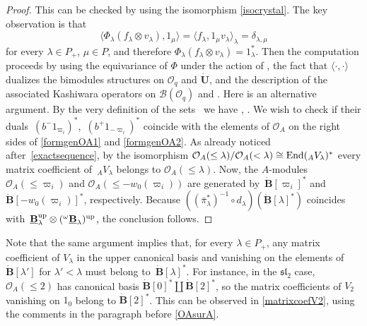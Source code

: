 \documentclass[10pt,a4paper]{amsart}
\numberwithin{equation}{section}
\theoremstyle{definition}
\newcommand{\Oq}{\Oo_{q}}
\newcommand{\Oo}{{\mathcal O}}
\begin{document}
\begin{proof} This can be checked by using the isomorphism \eqref{isocrystal}. The key observation is that
 \[\langle \Phi_\lambda(f_\lambda \otimes v_\lambda), 1_\mu\rangle = \langle f_\lambda , 1_\mu v_\lambda \rangle_\lambda = \delta_{\lambda,\mu}\]
 for every $\lambda\in P_+$, $\mu\in P$, and therefore $\Phi_\lambda(f_\lambda \otimes v_\lambda) = 1_\lambda^*$. Then the computation proceeds by using the equivariance of $\Phi$ under the action of , the fact that $\langle\cdot,\cdot \rangle$ dualizes the bimodules structures on $\Oq$ and $\dot{\mathbf{U}}$, and the description of the associated Kashiwara operators on $\mathcal{B}(\Oo_q)$ and . Here is an alternative argument. By the very definition of the sets~ we have , . We wish to check if their duals~$(b^-1_{\varpi_i})^*$,~$(b^+1_{-\varpi_i})^*$ coincide with the elements of $\Oo_A$ on the right sides of \eqref{formgenOA1} and \eqref{formgenOA2}. As already noticed after~\eqref{exactsequence}, by the isomorphism $\Oo_A(\leq \lambda)/\Oo_A(<\lambda) \cong {\rm End}({}_AV_\lambda)^*$ every matrix coefficient of~${}_AV_\lambda$ belongs to $\Oo_A(\leq \lambda)$. Now, the $A$-modules $\Oo_A(\leq \varpi_i)$ and $\Oo_A(\leq -w_0(\varpi_i))$ are generated by~${\dot{\mathbf{B}}[\varpi_i]^*}$ and $\dot{\mathbf{B}} [-w_0(\varpi_i)]^*$, respectively. Because $((\bar{\pi}_{\lambda}^*)^{-1} \circ d_{\lambda})(\dot{\mathbf{B}} [\lambda]^*)$ coincides with~${\underline{\mathbf{B}}_{\lambda}^{\rm up} \otimes ({}^{\omega}\underline{\mathbf{B}}_{\lambda})^{\rm up}}$, the conclusion follows.
 \end{proof}

Note that the same argument implies that, for every $\lambda\in P_+$, any matrix coefficient of $V_\lambda$ in the upper canonical basis and vanishing on the elements of $\dot{\mathbf{B}} [\lambda']$ for $\lambda'<\lambda$ must belong to~$\dot{\mathbf{B}} [\lambda]^*$. For instance, in the ${\mathfrak{sl}_2}$ case, $\Oo_A(\leq 2)$ has canonical basis $\dot{\mathbf{B}} [0]^* \coprod \dot{\mathbf{B}} [2]^*$, so the matrix coefficients of $V_2$ vanishing on $1_0$ belong to $\dot{\mathbf{B}} [2]^*$. This can be observed in \eqref{matrixcoefV2}, using the comments in the paragraph before \eqref{OAsurA}.
\end{document}
